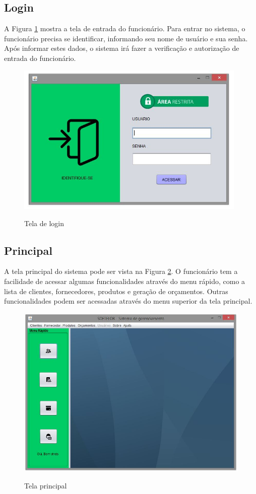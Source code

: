 \subsection{Login}
A Figura \ref{fig:Tela-de-Login} mostra a tela de entrada do funcionário. Para entrar no sistema, o funcionário precisa se identificar, informando seu nome de usuário e sua senha. Após informar estes dados, o sistema irá fazer a verificação e autorização de entrada do funcionário.
\begin{figure}[H]
\centering
\caption{Tela de login}
\includegraphics[width=11cm]{imagens/telas/Login}
\label{fig:Tela-de-Login}
\end{figure}
      
      
\subsection{Principal}
A tela principal do sistema pode ser vista na Figura \ref{fig:Tela-principal}. O funcionário tem a facilidade de acessar algumas funcionalidades através do menu rápido, como a lista de clientes, fornecedores, produtos e geração de orçamentos. Outras funcionalidades podem ser acessadas através do menu superior da tela principal.

\begin{figure}[H]
\centering
\caption{Tela principal}
\includegraphics[width=12cm]{imagens/telas/Principal}
\label{fig:Tela-principal}
\end{figure}
       
